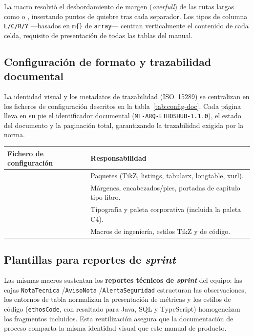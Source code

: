 \begin{NotaTecnica}
La macro  resolvió el desbordamiento de margen
(\textit{overfull}) de las rutas largas como  o
, insertando puntos de quiebre tras cada
separador. Los tipos de columna \texttt{L/C/R/Y} —basados en \texttt{m\{\}} de \texttt{array}—
centran verticalmente el contenido de cada celda, requisito de presentación de todas las
tablas del manual.
\end{NotaTecnica}

\subsection{Configuración de formato y trazabilidad documental}
\label{subsec:formato_doc}

La identidad visual y los metadatos de trazabilidad (ISO~15289) se centralizan en los
ficheros de configuración descritos en la tabla~\ref{tab:config-doc}. Cada página lleva en
su pie el identificador documental (\texttt{MT-ARQ-ETHOSHUB-1.1.0}), el estado del
documento y la paginación total, garantizando la trazabilidad exigida por la norma.

\vspace{0.2cm}
\noindent
\renewcommand{\arraystretch}{1.3}
\fontsize{8.5}{10.2}\selectfont\sffamily
\begin{tabularx}{\textwidth}{|L{3.8cm}|Y|}
\hline
{}
\sffamily\textbf{Fichero de configuración} & \sffamily\textbf{Responsabilidad} \\
\hline
{} & Paquetes (TikZ, listings, tabularx, longtable, xurl). \\ \hline
{}
 & Márgenes, encabezados/pies, portadas de capítulo tipo libro. \\ \hline
{} & Tipografía y paleta corporativa (incluida la paleta C4). \\ \hline
{}
 & Macros de ingeniería, estilos TikZ y de código. \\ \hline
\end{tabularx}
\label{tab:config-doc}

\subsection{Plantillas para reportes de \textit{sprint}}
\label{subsec:sprint}

Las mismas macros sustentan los \textbf{reportes técnicos de \textit{sprint}} del equipo:
las cajas \texttt{NotaTecnica} /\texttt{AvisoNota} /\texttt{AlertaSeguridad} estructuran las
observaciones, los entornos de tabla normalizan la presentación de métricas y los estilos
de código (\texttt{ethosCode}, con resaltado para Java, SQL y TypeScript) homogeneízan los
fragmentos incluidos. Esta reutilización asegura que la documentación de proceso comparta
la misma identidad visual que este manual de producto.

